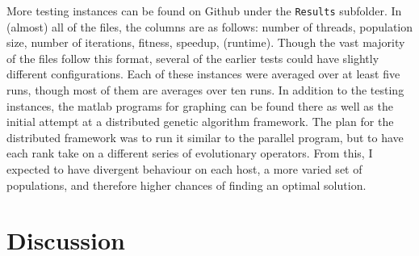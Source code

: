 \documentclass[10pt,letterpaper]{article}
\begin{document}
More testing instances can be found on Github under the \texttt{Results} subfolder. In (almost) all of the files, the columns are as follows: number of threads, population size, number of iterations, fitness, speedup, (runtime). Though the vast majority of the files follow this format, several of the earlier tests could have slightly different configurations. Each of these instances were averaged over at least five runs, though most of them are averages over ten runs. In addition to the testing instances, the matlab programs for graphing can be found there as well as the initial attempt at a distributed genetic algorithm framework. The plan for the distributed framework was to run it similar to the parallel program, but to have each rank take on a different series of evolutionary operators. From this, I expected to have divergent behaviour on each host, a more varied set of populations, and therefore higher chances of finding an optimal solution.

\section{Discussion}
\end{document}

